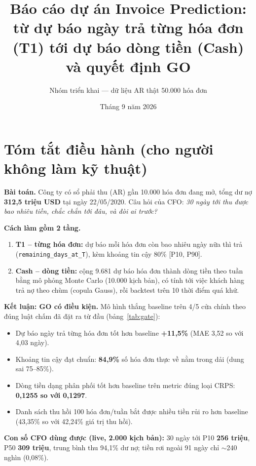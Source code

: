 \documentclass[12pt,a4paper]{article}
\title{Báo cáo dự án Invoice Prediction:\\từ dự báo ngày trả từng hóa đơn (T1) tới dự báo dòng tiền (Cash) và quyết định GO}
\author{Nhóm triển khai --- dữ liệu AR thật 50.000 hóa đơn}
\date{Tháng 9 năm 2026}
\begin{document}
\maketitle
\tableofcontents
\newpage

\section{Tóm tắt điều hành (cho người không làm kỹ thuật)}
\label{sec:summary}

\textbf{Bài toán.} Công ty có sổ phải thu (AR) gần 10.000 hóa đơn đang mở, tổng dư nợ
\textbf{312,5 triệu USD} tại ngày 22/05/2020. Câu hỏi của CFO: \textit{30 ngày tới thu được bao nhiêu tiền, chắc chắn tới đâu, và đòi ai trước?}

\textbf{Cách làm gồm 2 tầng.}
\begin{enumerate}
\item \textbf{T1 -- từng hóa đơn:} dự báo mỗi hóa đơn còn bao nhiêu ngày nữa thì trả
(\texttt{remaining\_days\_at\_T}), kèm khoảng tin cậy 80\% [P10, P90].
\item \textbf{Cash -- dòng tiền:} cộng 9.681 dự báo hóa đơn thành dòng tiền theo tuần bằng
mô phỏng Monte Carlo (10.000 kịch bản), có tính tới việc khách hàng trả nợ theo chùm
(copula Gauss), rồi backtest trên 10 thời điểm quá khứ.
\end{enumerate}

\textbf{Kết luận: GO có điều kiện.} Mô hình thắng baseline trên 4/5 cửa chính theo đúng luật
chấm đã đặt ra từ đầu (bảng~\ref{tab:gate}):
\begin{itemize}
\item Dự báo ngày trả từng hóa đơn tốt hơn baseline \textbf{+11,5\%} (MAE 3,52 so với 4,03 ngày).
\item Khoảng tin cậy đạt chuẩn: \textbf{84,9\%} số hóa đơn thực về nằm trong dải (dung sai 75--85\%).
\item Dòng tiền dạng phân phối tốt hơn baseline trên metric đúng loại CRPS:
\textbf{0,1255 so với 0,1297}.
\item Danh sách thu hồi 100 hóa đơn/tuần bắt được nhiều tiền rủi ro hơn baseline
(43,35\% so với 42,24\% giá trị thu hồi).
\end{itemize}

\textbf{Con số CFO dùng được (live, 2.000 kịch bản):}
30 ngày tới P10 \textbf{256 triệu}, P50 \textbf{309 triệu}, trung bình thu 94,1\% dư nợ;
tiền rơi ngoài 91 ngày chỉ $\sim$240 nghìn (0,08\%).
\end{document}
